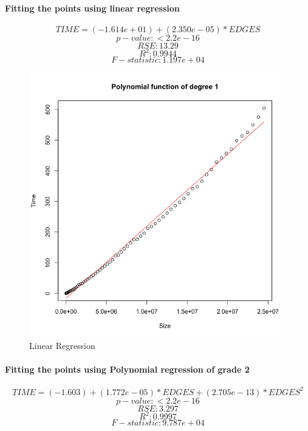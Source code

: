 \documentclass{article}
\begin{document}
\paragraph{Fitting the points using linear regression}

$$ TIME = (-1.614e+01) + (2.350e-05)*EDGES $$
$$ p-value: < 2.2e-16 $$
$$ RSE: 13.29 $$
$$ R^{2}:  0.9944 $$
$$ F-statistic: 1.197e+04 $$

\begin{figure}[H]
\centering
\includegraphics[width=\linewidth]{Rplot3.png}
\caption{Linear Regression}
\end{figure}


\paragraph{Fitting the points using Polynomial regression of grade 2}
$$ TIME = (-1.603) + (1.772e-05)*EDGES +(2.705e-13)*EDGES^{2}$$
$$ p-value: < 2.2e-16 $$
$$ RSE: 3.297  $$
$$ R^{2}:  0.9997 $$
$$ F-statistic:9.787e+04$$
\end{document}
